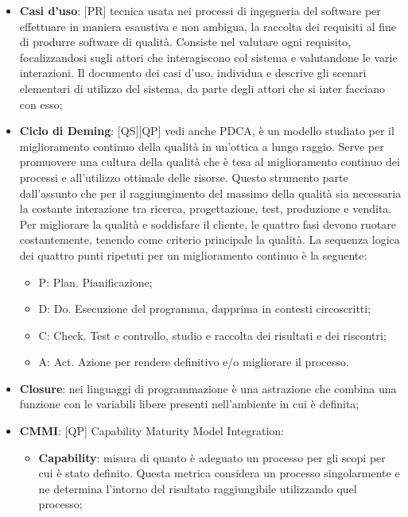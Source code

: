 	\begin{itemize}
		\item \textbf{Casi d'uso}: [PR] tecnica usata nei processi di ingegneria del software per effettuare in maniera esaustiva e non ambigua, la raccolta dei requisiti al fine di produrre software di qualità. Consiste nel valutare ogni requisito, focalizzandosi sugli attori che interagiscono col sistema e valutandone le varie interazioni. Il documento dei casi d’uso, individua e descrive gli scenari elementari di utilizzo del sistema, da parte degli attori che si inter facciano con esso;

		\item \textbf{Ciclo di Deming}: [QS][QP] vedi anche PDCA, è un modello studiato per il miglioramento continuo della qualità in un’ottica a lungo raggio. Serve per promuovere una cultura della qualità che è tesa al miglioramento continuo dei processi e all’utilizzo ottimale delle risorse. Questo strumento parte dall’assunto che per il raggiungimento del massimo della qualità sia necessaria la costante interazione tra ricerca, progettazione, test, produzione e vendita. \newline
	Per migliorare la qualità e soddisfare il cliente, le quattro fasi devono ruotare costantemente, tenendo come criterio principale la qualità.
	La sequenza logica dei quattro punti ripetuti per un miglioramento continuo è la seguente:
		\begin{itemize}
			\item P: Plan. Pianificazione;
			\item D: Do. Esecuzione del programma, dapprima in contesti circoscritti;
			\item C: Check. Test e controllo, studio e raccolta dei risultati e dei riscontri;
			\item A: Act. Azione per rendere definitivo e/o migliorare il processo.
		\end{itemize}
		\item \textbf{Closure}: nei linguaggi di programmazione è una astrazione che combina una funzione con le variabili libere presenti nell'ambiente in cui è definita;
		\item \textbf{CMMI}: [QP] Capability Maturity Model Integration:
			\begin{itemize}
				\item \textbf{Capability}: misura di quanto è adeguato un processo per gli scopi per cui è stato definito. Questa metrica considera un processo singolarmente e ne determina l'intorno del risultato raggiungibile utilizzando quel processo;

\end{itemize}
\end{itemize}
